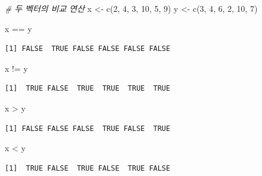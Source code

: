 \documentclass[
  11pt,
]{krantz}
\newenvironment{Shaded}{\begin{snugshade}}{\end{snugshade}}
\newcommand{\CommentTok}[1]{\textcolor[rgb]{0.37,0.37,0.37}{\textit{#1}}}
\newcommand{\DecValTok}[1]{\textcolor[rgb]{0.06,0.06,0.06}{#1}}
\newcommand{\FunctionTok}[1]{\textcolor[rgb]{0,0,0}{#1}}
\newcommand{\NormalTok}[1]{#1}
\newcommand{\OtherTok}[1]{\textcolor[rgb]{0.37,0.37,0.37}{#1}}
\newcommand{\SpecialCharTok}[1]{\textcolor[rgb]{0,0,0}{#1}}
\begin{document}
\footnotesize

\begin{Shaded}
\begin{Highlighting}[]
\CommentTok{\# 두 벡터의 비교 연산}
\NormalTok{x }\OtherTok{\textless{}{-}} \FunctionTok{c}\NormalTok{(}\DecValTok{2}\NormalTok{, }\DecValTok{4}\NormalTok{, }\DecValTok{3}\NormalTok{, }\DecValTok{10}\NormalTok{, }\DecValTok{5}\NormalTok{, }\DecValTok{9}\NormalTok{)}
\NormalTok{y }\OtherTok{\textless{}{-}} \FunctionTok{c}\NormalTok{(}\DecValTok{3}\NormalTok{, }\DecValTok{4}\NormalTok{, }\DecValTok{6}\NormalTok{, }\DecValTok{2}\NormalTok{, }\DecValTok{10}\NormalTok{, }\DecValTok{7}\NormalTok{)}

\NormalTok{x }\SpecialCharTok{==}\NormalTok{ y}
\end{Highlighting}
\end{Shaded}

\begin{verbatim}
[1] FALSE  TRUE FALSE FALSE FALSE FALSE
\end{verbatim}

\begin{Shaded}
\begin{Highlighting}[]
\NormalTok{x }\SpecialCharTok{!=}\NormalTok{ y}
\end{Highlighting}
\end{Shaded}

\begin{verbatim}
[1]  TRUE FALSE  TRUE  TRUE  TRUE  TRUE
\end{verbatim}

\begin{Shaded}
\begin{Highlighting}[]
\NormalTok{x }\SpecialCharTok{\textgreater{}}\NormalTok{ y}
\end{Highlighting}
\end{Shaded}

\begin{verbatim}
[1] FALSE FALSE FALSE  TRUE FALSE  TRUE
\end{verbatim}

\begin{Shaded}
\begin{Highlighting}[]
\NormalTok{x }\SpecialCharTok{\textless{}}\NormalTok{ y}
\end{Highlighting}
\end{Shaded}

\begin{verbatim}
[1]  TRUE FALSE  TRUE FALSE  TRUE FALSE
\end{verbatim}
\end{document}
